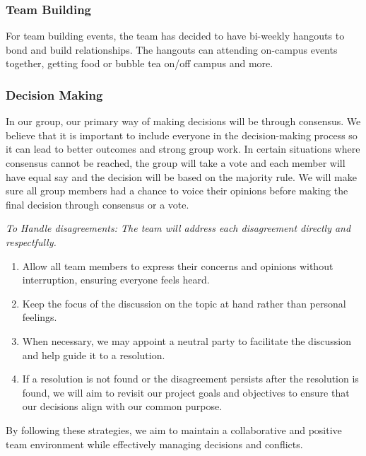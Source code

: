 \documentclass{article}
\begin{document}
\subsubsection*{\color{blue}Team Building}

For team building events, the team has decided to have bi-weekly
hangouts to bond and build relationships. The hangouts can
attending on-campus events together, getting food or bubble tea
on/off campus and more.

\subsubsection*{\color{blue}Decision Making}

In our group, our primary way of making decisions will be through
consensus. We believe that it is important
to include everyone in the decision-making process so it can lead to
better outcomes and strong group work.
In certain situations where consensus cannot be reached, the group
will take a vote and each member will have
equal say and the decision will be based on the majority rule. We
will make sure all group members had a chance
to voice their opinions before making the final decision through
consensus or a vote.

\vspace{10pt}
\textit{To Handle disagreements: The team will address each
disagreement directly and respectfully.}

\begin{enumerate}
  \item Allow all team members to express their concerns and opinions
    without interruption, ensuring everyone
    feels heard.
  \item Keep the focus of the discussion on the topic at hand rather
    than personal feelings.
  \item When necessary, we may appoint a neutral party to facilitate
    the discussion and help guide it to a resolution.
  \item If a resolution is not found or the disagreement persists
    after the resolution is found, we will aim to
    revisit our project goals and objectives to ensure that our
    decisions align with our common purpose.
\end{enumerate}
By following these strategies, we aim to maintain a collaborative and
positive team environment while effectively
managing decisions and conflicts.
\end{document}
